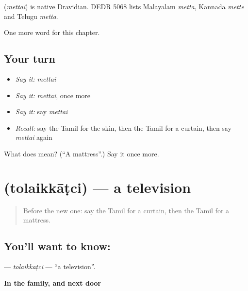 \begin{cousinweb}
\textbf{} (\emph{mettai}) is native Dravidian. DEDR 5068 lists Malayalam \emph{metta}, Kannada \emph{mette} and Telugu \emph{metta}.
\end{cousinweb}

\begin{grammarlens}[title={What you've built}]
One more word for this chapter.
\end{grammarlens}

\subsection*{Your turn}
\begin{itemize}
\raggedright
  \item \emph{Say it:} \emph{mettai}
  \item \emph{Say it:} \emph{mettai}, once more
  \item \emph{Say it:} say \emph{mettai}
  \item \emph{Recall:} say the Tamil for the skin, then the Tamil for a curtain, then say \emph{mettai} again
\end{itemize}

\begin{tcolorbox}[breakable,colback=teal!4,colframe=teal!35!black,title={Before you move on}]
What does  mean? (\textquotedblleft{}A mattress\textquotedblright{}.) Say it once more.
\end{tcolorbox}
\section[\texorpdfstring{\ta{தொலைக்காட்சி} (tolaikkāṭci)}{தொலைக்காட்சி (tolaikkāṭci)}]{ (tolaikkāṭci) — a television}

\label{lesson:TA-C134-tolaikkatci}



\begin{quote}
Before the new one: say the Tamil for a curtain, then the Tamil for a mattress.
\end{quote}

\subsection*{You'll want to know: }
\textbf{} — \emph{tolaikkāṭci} — \textquotedblleft{}a television\textquotedblright{}.

\textbf{In the family, and next door}

